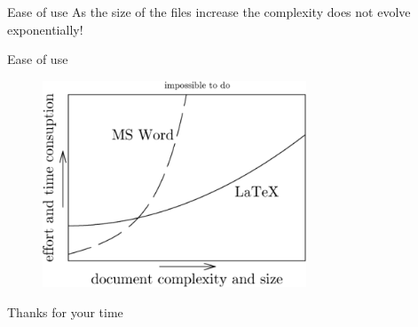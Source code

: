 \documentclass[compress]{beamer}
\begin{document}
\begin{frame}{Ease of use}
    As the size of the files increase the complexity does not evolve exponentially!
\end{frame}
\begin{frame}{Ease of use}
\begin{figure}
    \centering
    \includegraphics[width=0.7\textwidth]{img/wordvslatex.png}
\end{figure}
\end{frame}

\begin{frame}{}

    \huge{Thanks for your time}
\end{frame}
\end{document}
